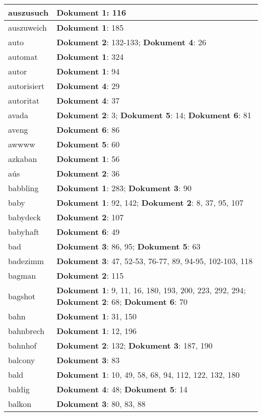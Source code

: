 \documentclass[a5paper]{article}
\begin{document}
\begin{longtable}[l]{|l|p{3in}|}
\hline
auszusuch & \textbf{Dokument 1}: 116 \\
\hline
auszuweich & \textbf{Dokument 1}: 185 \\
\hline
auto & \textbf{Dokument 2}: 132-133; \textbf{Dokument 4}: 26 \\
\hline
automat & \textbf{Dokument 1}: 324 \\
\hline
autor & \textbf{Dokument 1}: 94 \\
\hline
autorisiert & \textbf{Dokument 4}: 29 \\
\hline
autoritat & \textbf{Dokument 4}: 37 \\
\hline
avada & \textbf{Dokument 2}: 3; \textbf{Dokument 5}: 14; \textbf{Dokument 6}: 81 \\
\hline
aveng & \textbf{Dokument 6}: 86 \\
\hline
awwww & \textbf{Dokument 5}: 60 \\
\hline
azkaban & \textbf{Dokument 1}: 56 \\
\hline
aús & \textbf{Dokument 2}: 36 \\
\hline
babbling & \textbf{Dokument 1}: 283; \textbf{Dokument 3}: 90 \\
\hline
baby & \textbf{Dokument 1}: 92, 142; \textbf{Dokument 2}: 8, 37, 95, 107 \\
\hline
babydeck & \textbf{Dokument 2}: 107 \\
\hline
babyhaft & \textbf{Dokument 6}: 49 \\
\hline
bad & \textbf{Dokument 3}: 86, 95; \textbf{Dokument 5}: 63 \\
\hline
badezimm & \textbf{Dokument 3}: 47, 52-53, 76-77, 89, 94-95, 102-103, 118 \\
\hline
bagman & \textbf{Dokument 2}: 115 \\
\hline
bagshot & \textbf{Dokument 1}: 9, 11, 16, 180, 193, 200, 223, 292, 294; \textbf{Dokument 2}: 68; \textbf{Dokument 6}: 70 \\
\hline
bahn & \textbf{Dokument 1}: 31, 150 \\
\hline
bahnbrech & \textbf{Dokument 1}: 12, 196 \\
\hline
bahnhof & \textbf{Dokument 2}: 132; \textbf{Dokument 3}: 187, 190 \\
\hline
balcony & \textbf{Dokument 3}: 83 \\
\hline
bald & \textbf{Dokument 1}: 10, 49, 58, 68, 94, 112, 122, 132, 180 \\
\hline
baldig & \textbf{Dokument 4}: 48; \textbf{Dokument 5}: 14 \\
\hline
balkon & \textbf{Dokument 3}: 80, 83, 88 \\

\end{longtable}
\end{document}

